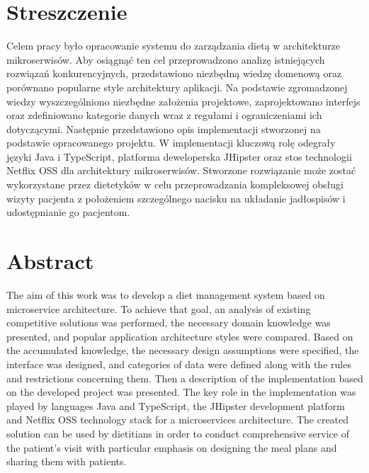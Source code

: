 \chapter*{Streszczenie} %
Celem pracy było opracowanie systemu do zarządzania dietą w architekturze mikroserwisów.
Aby osiągnąć ten cel przeprowadzono analizę istniejących rozwiązań konkurencyjnych, przedstawiono niezbędną wiedzę domenową oraz porównano popularne style architektury aplikacji.
Na podstawie zgromadzonej wiedzy wyszczególniono niezbędne założenia projektowe, zaprojektowano interfejs oraz zdefiniowano kategorie danych wraz z regułami i ograniczeniami ich dotyczącymi.
Następnie przedstawiono opis implementacji stworzonej na podstawie opracowanego projektu.
W implementacji kluczową rolę odegrały języki Java\cite{tech:java} i TypeScript\cite{tech:typescript}, platforma deweloperska JHipster\cite{tech:jhipster} oraz stos technologii Netflix OSS\cite{tech:netflix-oss} dla architektury mikroserwisów.
Stworzone rozwiązanie może zostać wykorzystane przez dietetyków w celu przeprowadzania kompleksowej obsługi wizyty pacjenta z położeniem szczególnego nacisku na układanie jadłospisów i udostępnianie go pacjentom.


\begingroup
\renewcommand{\cleardoublepage}{}
\renewcommand{\clearpage}{}
\chapter*{Abstract} %
The aim of this work was to develop a diet management system based on microservice architecture.
To achieve that goal, an analysis of existing competitive solutions was performed, the necessary domain knowledge was presented, and popular application architecture styles were compared.
Based on the accumulated knowledge, the necessary design assumptions were specified, the interface was designed, and categories of data were defined along with the rules and restrictions concerning them.
Then a description of the implementation based on the developed project was presented.
The key role in the implementation was played by languages Java\cite{tech:java} and TypeScript\cite{tech:typescript}, the JHipster\cite{tech:jhipster} development platform and Netflix OSS\cite{tech:netflix-oss} technology stack for a microservices architecture.
The created solution can be used by dietitians in order to conduct comprehensive service of the patient's visit with particular emphasis on designing the meal plans and sharing them with patients.
\endgroup
{}

